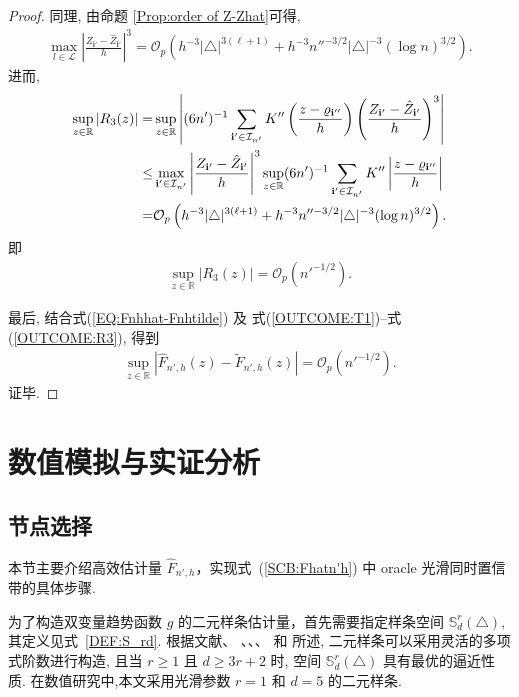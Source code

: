 \documentclass[a4paper,openay,14pt]{ctexbook}
\numberwithin{equation}{section}
\numberwithin{lem}{section}
\newcommand{\chapterwithfancyheader}[1]{  
    \chapter{#1} %
    \thispagestyle{fancy} %
}
\begin{document}
\begin{proof}
同理, 由命题 \ref{Prop:order of Z-Zhat}可得,
\begin{align*}
            \max_{l\in\mathcal{L}}\left\vert\frac{Z_{\mathbf{i}'}-\hat{Z}_{\mathbf{i}'}}{h}\right\vert^3 = \mathcal{O}_p\left(h^{-3}\vert\triangle\vert^{3(\ell+1)}+h^{-3}n''^{-3/2}\vert\triangle\vert^{-3}(\log n)^{3/2}\right).
        \end{align*}
进而,
\begin{align*}
            \sup_{z\in\mathbb{R}}\left\vert R_3(z)\right\vert = & \sup_{z\in\mathbb{R}}\left\vert (6n')^{-1}\sum_{\mathbf{i}'\in\mathcal{I}_{n'}}K''\left(\frac{z-\varrho_{\mathbf{i}''}}{h}\right)\left(\frac{Z_{\mathbf{i}'}-\hat{Z}_{\mathbf{i}'}}{h}\right)^3\right\vert\notag\\
            \leq& \max_{\mathbf{i}'\in\mathcal{I}_{n'}}\left\vert\frac{Z_{\mathbf{i}'}-\hat{Z}_{\mathbf{i}'}}{h}\right\vert^3\sup_{z\in\mathbb{R}}(6n')^{-1}\sum_{\mathbf{i}'\in\mathcal{I}_{n'}}K''\left\vert\frac{z-\varrho_{\mathbf{i}''}}{h}\right\vert\notag\\
            =& \mathcal{O}_p\left(h^{-3}\vert\triangle\vert^{3(\ell+1)}+h^{-3}n''^{-3/2}\vert\triangle\vert^{-3}(\log n)^{3/2}\right).\notag
        \end{align*}
        即
    \begin{align}\label{OUTCOME:R3}
                \sup_{z\in\mathbb{R}}\left\vert R_3(z)\right\vert = {\scriptstyle\mathcal{O}}_p(n'^{-1/2}).
            \end{align}

最后, 结合式(\ref{EQ:Fnhhat-Fnhtilde}) 及
式(\ref{OUTCOME:T1})–式(\ref{OUTCOME:R3}), 得到
\begin{align*}
    \sup_{z\in\mathbb{R}}
    \left|\hat{F}_{n',h}(z)-\tilde{F}_{n',h}(z)\right|
    ={\scriptstyle\mathcal{O}}_p\left(n'^{-1/2}\right).
\end{align*}
证毕.

\end{proof}


\chapterwithfancyheader{数值模拟与实证分析}\label{SEC: application}

\section{节点选择}
本节主要介绍高效估计量 $\hat{F}_{n',h}$，实现式~(\ref{SCB:Fhatn'h}) 中 oracle 光滑同时置信带的具体步骤.

 为了构造双变量趋势函数 $g$ 的二元样条估计量，首先需要指定样条空间 $\mathbb{S}_{d}^{r}(\triangle)$, 其定义见式~\eqref{DEF:S_rd}. 根据文献\cite{lai2007spline}、 \cite{yu2019estimation}、\cite{kim2021generalized}、\cite{li2021sparse}、\cite{Zhang16122024} 和 \cite{li2021nonparametric} 所述, 二元样条可以采用灵活的多项式阶数进行构造, 且当 $r \geq 1$ 且 $d \geq 3r + 2$ 时, 空间 $\mathbb{S}_{d}^{r}(\triangle)$ 具有最优的逼近性质. 在数值研究中,本文采用光滑参数 $r = 1$ 和 $d = 5$ 的二元样条.
\end{document}
